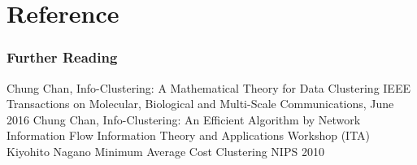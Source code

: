 \documentclass{beamer}
\begin{document}
\section{Reference}
\begin{frame}
\frametitle{Further Reading}
\begin{thebibliography}{9}
 Chung Chan, \newblock Info-Clustering: A Mathematical Theory for Data Clustering
\newblock  IEEE Transactions on Molecular, Biological and Multi-Scale Communications, June 2016
  Chung Chan, \newblock Info-Clustering: An Efficient Algorithm by Network Information Flow
 Information Theory and Applications Workshop (ITA)
 Kiyohito Nagano \newblock Minimum Average Cost Clustering \newblock NIPS 2010
\end{thebibliography}
\end{frame}
\end{document}
